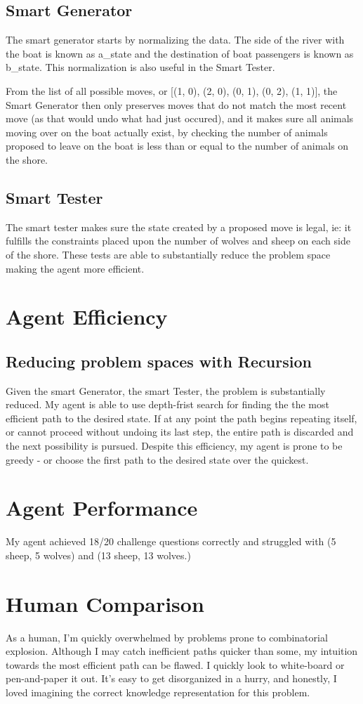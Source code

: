 \documentclass[
	letterpaper, %
]{jdf}
\begin{document}
\subsection{Smart Generator}

The smart generator starts by normalizing the data. The side of the river with the boat is known as a\_state and the destination of boat passengers is known as b\_state. This normalization is also useful in the Smart Tester.

From the list of all possible moves, or [(1, 0), (2, 0), (0, 1), (0, 2), (1, 1)], the Smart Generator then only preserves moves that do not match the most recent move (as that would undo what had just occured), and it makes sure all animals moving over on the boat actually exist, by checking the number of animals proposed to leave on the boat is less than or equal to the number of animals on the shore.

\subsection{Smart Tester}
The smart tester makes sure the state created by a proposed move is legal, ie: it fulfills the constraints placed upon the number of wolves and sheep on each side of the shore. These tests are able to substantially reduce the problem space making the agent more efficient.

\section{Agent Efficiency}

\subsection{Reducing problem spaces with Recursion}
Given the smart Generator, the smart Tester, the problem is substantially reduced. My agent is able to use depth-frist search for finding the the most efficient path to the desired state. If at any point the path begins repeating itself, or cannot proceed without undoing its last step, the entire path is discarded and the next possibility is pursued. Despite this efficiency, my agent is prone to be greedy - or choose the first path to the desired state over the quickest.

\section{Agent Performance}
My agent achieved 18/20 challenge questions correctly and struggled with (5 sheep, 5 wolves) and (13 sheep, 13 wolves.)

\section{Human Comparison}
As a human, I'm quickly overwhelmed by problems prone to combinatorial explosion. Although I may catch inefficient paths quicker than some, my intuition towards the most efficient path can be flawed. I quickly look to white-board or pen-and-paper it out. It's easy to get disorganized in a hurry, and honestly, I loved imagining the correct knowledge representation for this problem.
\end{document}
